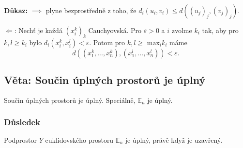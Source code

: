 \documentclass[../main.tex]{subfiles}
\begin{document}
\vspace{5mm}
\noindent
\textbf{Důkaz:} $\implies$ plyne bezprostředně z toho, že $d_i(u_i,v_i) \leq d((u_j)_j,(v_j)_j).$

$\Leftarrow$: Nechť je každá $(x_i^k)_k$ Cauchyovská. Pro $\varepsilon > 0$ a $i$ zvolme $k_i$ tak,
aby pro $k,l \geq k_i$ bylo $d_i(x_i^k, x_i^l) < \varepsilon.$ Potom pro $k,l \geq$ $\text{max}_i k_i$ máme 
\[d((x_1^k,...,x_n^k),(x_1^l,...,x_n^l)) < \varepsilon.\]

\subsection{Věta: Součin úplných prostorů je úplný }
\hspace{1.2mm}
\noindent
Součin úplných prostorů je úplný. Speciálně, $\mathbb{E}_n$ je úplný.

\subsubsection{Důsledek}
\hspace{1.2mm}
\noindent
Podprostor $Y$ euklidovského prostoru $\mathbb{E}_n$ je úplný, právě když je uzavřený.
\end{document}
